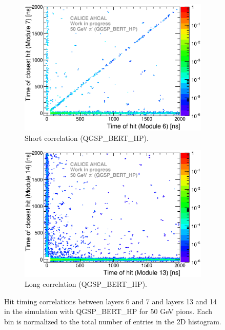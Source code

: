 \begin{figure}[htbp!]
	\begin{subfigure}[t]{0.49\textwidth}
		\centering
		\includegraphics[width=1\textwidth]{../Thesis_Plots/Timing/Pions/Plots/ComparisonToSim/Time_Correlation_50GeV_short_QGSPBERTHP.eps}
		\caption{Short correlation (QGSP\_BERT\_HP).} \label{fig:Corr_short_QGSPBERTHP}
	\end{subfigure}
	\hfill
	\begin{subfigure}[t]{0.49\textwidth}
		\centering
		\includegraphics[width=1\textwidth]{../Thesis_Plots/Timing/Pions/Plots/ComparisonToSim/Time_Correlation_50GeV_long_QGSPBERTHP.eps}
		\caption{Long correlation (QGSP\_BERT\_HP).} \label{fig:Corr_long_QGSPBERTHP}
	\end{subfigure}
	\caption{Hit timing correlations between layers 6 and 7 and layers 13 and 14 in the \mokka simulation with QGSP\_BERT\_HP for 50 GeV pions. Each bin is normalized to the total number of entries in the 2D histogram.}
	\label{fig:Corr_Mokka_Simulation}
\end{figure}

